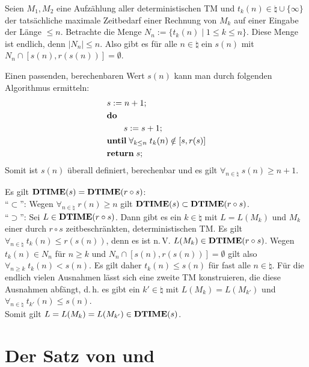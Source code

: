 \begin{Beweis}
    Seien $M_1, M_2$ eine Aufzählung aller deterministischen TM und
    $t_k(n) \in \natural \cup \{\infty\}$ der tatsächliche maximale Zeitbedarf einer Rechnung
    von $M_k$ auf einer Eingabe der Länge $\le n$.
    Betrachte die Menge $N_n := \{t_k(n) \;|\; 1 \le k \le n\}$.
    Diese Menge ist endlich, denn $|N_n| \le n$.
    Also gibt es für alle $n \in \natural$ ein $s(n)$ mit
    $N_n \cap [s(n), r(s(n))] = \emptyset$.

    Einen passenden, berechenbaren Wert $s(n)$ kann man durch folgenden Algorithmus ermitteln:
    \begin{align*}
        &s := n + 1;\\
        &\mathbf{do}\;\\
        &\qquad s := s + 1;\\
        &\mathbf{until}\; \forall_{k \le n}\; t_k(n) \notin [s, r(s)]\\
        &\mathbf{return}\; s;
    \end{align*}
    Somit ist $s(n)$ überall definiert, berechenbar und es gilt
    $\forall_{n \in \natural}\; s(n) \ge n + 1$.

    Es gilt $\mathbf{DTIME}(s) = \mathbf{DTIME}(r \circ s)$:\\
    "`$\subset$"':
    Wegen $\forall_{n \in \natural}\; r(n) \ge n$ gilt $\mathbf{DTIME}(s) \subset \mathbf{DTIME}(r \circ s)$.\\
    "`$\supset$"':
    Sei $L \in \mathbf{DTIME}(r \circ s)$.
    Dann gibt es ein $k \in \natural$ mit $L = L(M_k)$ und $M_k$ einer durch $r \circ s$
    zeitbeschränkten, deterministischen TM.
    Es gilt $\forall_{n \in \natural}\; t_k(n) \le r(s(n))$, denn es ist n.\,V.
    $L(M_k) \in \mathbf{DTIME}(r \circ s)$.
    Wegen $t_k(n) \in N_n$ für $n \ge k$ und $N_n \cap [s(n), r(s(n))] = \emptyset$ gilt
    also $\forall_{n \ge k}\; t_k(n) < s(n)$.
    Es gilt daher $t_k(n) \le s(n)$ für fast alle $n \in \natural$.
    Für die endlich vielen Ausnahmen lässt sich eine zweite TM konstruieren, die diese
    Ausnahmen abfängt, d.\,h. es gibt ein $k' \in \natural$ mit $L(M_k) = L(M_{k'})$ und
    $\forall_{n \in \natural}\; t_{k'}(n) \le s(n)$.\\
    Somit gilt $L = L(M_k) = L(M_{k'}) \in \mathbf{DTIME}(s)$.
\end{Beweis}

\section{%
    Der Satz von  und %
}

